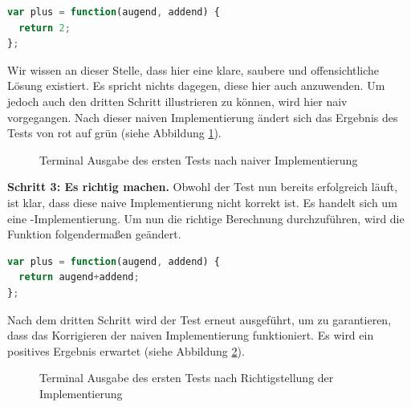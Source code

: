 {\begin{lstlisting}[language=JavaScript]
var plus = function(augend, addend) {
  return 2;
};
\end{lstlisting}

Wir wissen an dieser Stelle, dass hier eine klare, saubere und offensichtliche Lösung existiert. Es spricht nichts dagegen, diese hier auch anzuwenden. Um jedoch auch den dritten Schritt illustrieren zu können, wird hier naiv vorgegangen.\newline
Nach dieser naiven Implementierung ändert sich das Ergebnis des Tests von rot auf grün (siehe Abbildung \ref{figure:tdd-simple-step-1-2}).

\begin{figure}[H]
  \centering
  \caption{Terminal Ausgabe des ersten Tests nach naiver Implementierung}
  \label{figure:tdd-simple-step-1-2}
\end{figure}

\textbf{Schritt 3: Es richtig machen.}\newline
Obwohl der Test nun bereits erfolgreich läuft, ist klar, dass diese naive Implementierung nicht korrekt ist. Es handelt sich um eine -Implementierung. Um nun die richtige Berechnung durchzuführen, wird die Funktion  folgendermaßen geändert.

\begin{lstlisting}[language=JavaScript]
var plus = function(augend, addend) {
  return augend+addend;
};
\end{lstlisting}

Nach dem dritten Schritt wird der Test erneut ausgeführt, um zu garantieren, dass das Korrigieren der naiven Implementierung funktioniert. Es wird ein positives Ergebnis erwartet (siehe Abbildung \ref{figure:tdd-simple-step-1-3}).

\begin{figure}[H]
  \centering
  \caption{Terminal Ausgabe des ersten Tests nach Richtigstellung der Implementierung}
  \label{figure:tdd-simple-step-1-3}
\end{figure}

}
